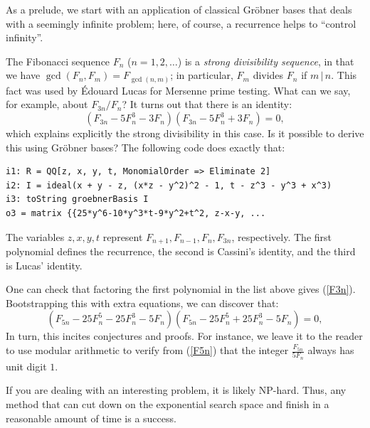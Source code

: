 As a prelude, we start with an application of classical Gr\"obner bases that deals with a seemingly infinite problem; here, of course, a recurrence helps to ``control infinity''.  

The Fibonacci sequence $F_n$ ($n= 1, 2, \ldots$) is a \textit{strong divisibility sequence}, in that we have $\gcd(F_n, F_m) = F_{\gcd(n,m)}$; in particular, $F_m$ divides $F_n$ if $m \, | \, n$.  This fact was used by \'Edouard Lucas for Mersenne prime testing.  What can we say, for example, about $F_{3n}/F_n$?  It turns out that there is an identity:
\begin{equation}\label{F3n}
(F_{3n} - 5 F_n^3 - 3 F_n)(F_{3n} - 5 F_n^3 + 3 F_n) = 0,
\end{equation}
which explains explicitly the strong divisibility in this case.   Is it possible to derive this using Gr\"obner bases?  The following code does exactly that:
\begin{M2}
\begin{verbatim}
i1: R = QQ[z, x, y, t, MonomialOrder => Eliminate 2]
i2: I = ideal(x + y - z, (x*z - y^2)^2 - 1, t - z^3 - y^3 + x^3)
i3: toString groebnerBasis I
o3 = matrix {{25*y^6-10*y^3*t-9*y^2+t^2, z-x-y, ...
\end{verbatim}
\end{M2}  
The variables $z,x,y,t$ represent $F_{n+1}, F_{n-1}, F_n, F_{3n}$, respectively.  The first polynomial defines the recurrence, the second is Cassini's identity, and the third is Lucas' identity.

One can check that factoring the first polynomial in the list above gives (\ref{F3n}).  Bootstrapping this with extra equations, we can discover that:
\begin{equation}\label{F5n}
(F_{5n} - 25 F_n^5 - 25 F_n^3 - 5 F_n)(F_{5n} - 25 F_n^5 + 25 F_n^3 - 5 F_n) = 0,
\end{equation}
In turn, this incites conjectures and proofs.  
For instance, we leave it to the reader to use modular arithmetic to verify from (\ref{F5n}) that the integer $\frac{F_{5n}}{5F_n}$ always has unit digit $1$.  

\iffalse
If you are dealing with an interesting problem, it is likely NP-hard.  Thus, any method that can cut down on the exponential search space and finish in a reasonable amount of time is a success.  


